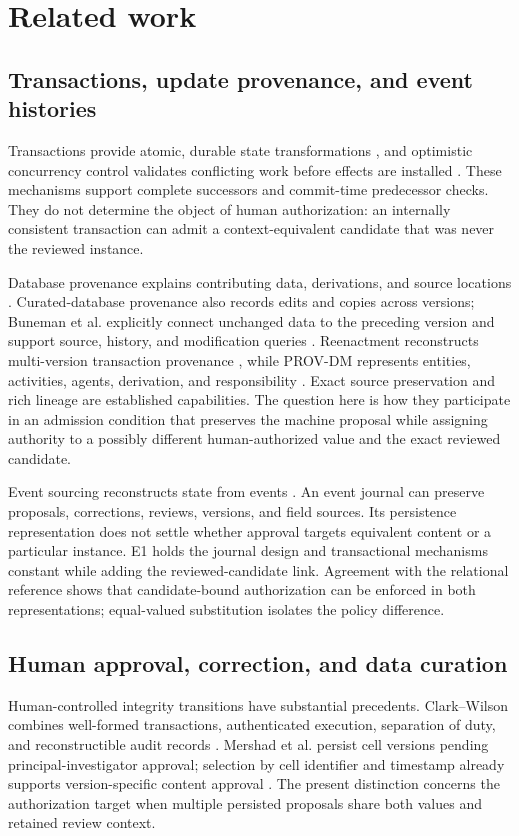 \section{Related work}
\label{sec:related}
\subsection{Transactions, update provenance, and event histories}
Transactions provide atomic, durable state transformations \citep{gray1981transaction}, and optimistic concurrency control validates conflicting work before effects are installed \citep{kung1981occ}. These mechanisms support complete successors and commit-time predecessor checks. They do not determine the object of human authorization: an internally consistent transaction can admit a context-equivalent candidate that was never the reviewed instance.

Database provenance explains contributing data, derivations, and source locations \citep{buneman2001whywhere,cheney2009provenance}. Curated-database provenance also records edits and copies across versions; Buneman et al. explicitly connect unchanged data to the preceding version and support source, history, and modification queries \citep{buneman2006curated}. Reenactment reconstructs multi-version transaction provenance \citep{arab2018reenactment}, while PROV-DM represents entities, activities, agents, derivation, and responsibility \citep{moreau2013provdm}. Exact source preservation and rich lineage are established capabilities. The question here is how they participate in an admission condition that preserves the machine proposal while assigning authority to a possibly different human-authorized value and the exact reviewed candidate.

Event sourcing reconstructs state from events \citep{fowler2005eventsourcing}. An event journal can preserve proposals, corrections, reviews, versions, and field sources. Its persistence representation does not settle whether approval targets equivalent content or a particular instance. E1 holds the journal design and transactional mechanisms constant while adding the reviewed-candidate link. Agreement with the relational reference shows that candidate-bound authorization can be enforced in both representations; equal-valued substitution isolates the policy difference.

\subsection{Human approval, correction, and data curation}
Human-controlled integrity transitions have substantial precedents. Clark--Wilson combines well-formed transactions, authenticated execution, separation of duty, and reconstructible audit records \citep{clark1987integrity}. Mershad et al. persist cell versions pending principal-investigator approval; selection by cell identifier and timestamp already supports version-specific content approval \citep{mershad2015approval}. The present distinction concerns the authorization target when multiple persisted proposals share both values and retained review context.

